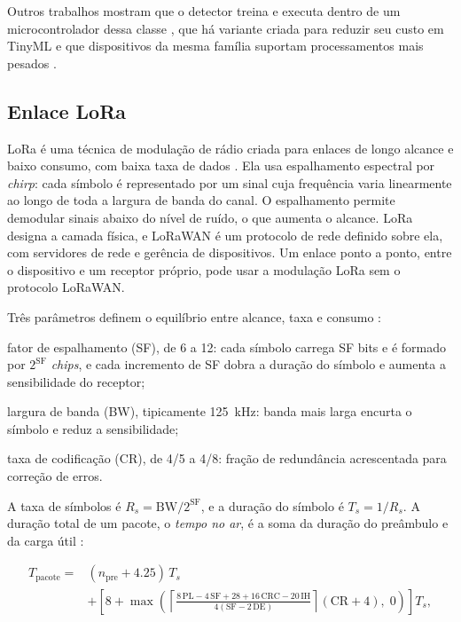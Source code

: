 Outros trabalhos mostram que o detector treina e executa dentro de um microcontrolador dessa classe \cite{antonini2023}, que há variante criada para reduzir seu custo em TinyML \cite{barbariol2022}
e que dispositivos da mesma família suportam processamentos mais pesados \cite{kumar2026,uselis2025}.

\subsection{Enlace LoRa}
\label{sec:fund-lora}

LoRa é uma técnica de modulação de rádio criada para enlaces de longo alcance e baixo consumo, com baixa taxa de dados \cite{augustin2016}. Ela usa espalhamento espectral por \emph{chirp}: cada
símbolo é representado por um sinal cuja frequência varia linearmente ao longo de toda a largura de banda do canal. O espalhamento permite demodular sinais abaixo do nível de ruído, o que aumenta o
alcance. LoRa designa a camada física, e LoRaWAN é um protocolo de rede definido sobre ela, com servidores de rede e gerência de dispositivos. Um enlace ponto a ponto, entre o dispositivo e um
receptor próprio, pode usar a modulação LoRa sem o protocolo LoRaWAN.

Três parâmetros definem o equilíbrio entre alcance, taxa e consumo \cite{semtech2015}:

\begin{alineas}
  \item fator de espalhamento (SF), de 6 a 12: cada símbolo carrega SF bits e é formado por $2^{\mathrm{SF}}$ \emph{chips}, e cada incremento de SF dobra a duração do símbolo e aumenta a
        sensibilidade do receptor;
  \item largura de banda (BW), tipicamente \SI{125}{\kilo\hertz}: banda mais larga encurta o símbolo e reduz a sensibilidade;
  \item taxa de codificação (CR), de 4/5 a 4/8: fração de redundância acrescentada para correção de erros.
\end{alineas}

A taxa de símbolos é $R_s = \mathrm{BW}/2^{\mathrm{SF}}$, e a duração do símbolo é $T_s = 1/R_s$. A duração total de um pacote, o \emph{tempo no ar}, é a soma da duração do preâmbulo e da carga útil
\cite{semtech2015}:

\begin{equation}
\begin{split}
T_{\mathrm{pacote}} = {} & (n_{\mathrm{pre}} + \num{4,25})\,T_s \\
& + \left[ 8 + \max\!\left( \left\lceil \frac{8\,\mathrm{PL} - 4\,\mathrm{SF} + 28 + 16\,\mathrm{CRC} - 20\,\mathrm{IH}}{4(\mathrm{SF} - 2\,\mathrm{DE})} \right\rceil (\mathrm{CR} + 4),\; 0 \right) \right] T_s,
\end{split}
\label{eq:fund-toa}
\end{equation}

